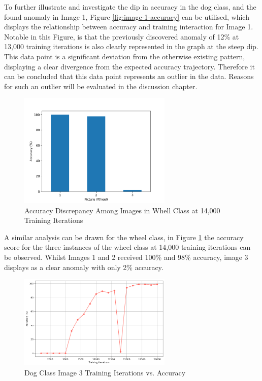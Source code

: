 To further illustrate and investigate the dip in accuracy in the dog class, and the found anomaly in Image 1,  Figure \ref{fig:image-1-accuracy} can be utilised, which displays the relationship between accuracy and training interaction for Image 1. Notable in this Figure, is that the previously discovered anomaly of 12\% at 13,000 training iterations is also clearly represented in the graph at the steep dip. This data point is a significant deviation from the otherwise existing pattern, displaying a clear divergence from the expected accuracy trajectory. Therefore it can be concluded that this data point represents an outlier in the data. Reasons for such an outlier will be evaluated in the discussion chapter.  

\begin{figure}[h!]
   \centering
   \includegraphics[width=0.65\textwidth]{../Data/wheel-outliers.png}
   \caption{Accuracy Discrepancy Among Images in Whell Class at 14,000 Training Iterations}
   \label{fig:13000-wheel}
\end{figure}

A similar analysis can be drawn for the wheel class, in Figure \ref{fig:13000-wheel} the accuracy score for the three instances of the wheel class at 14,000 training iterations can be observed. Whilst Images 1 and 2 received 100\% and 98\% accuracy, image 3 displays as a clear anomaly with only 2\% accuracy. 

\begin{figure}[h!]
   \centering
   \includegraphics[width=0.65\textwidth]{../Data/wheel_image1_accuracy_vs_iteration.png}
   \caption{Dog Class Image 3 Training Iterations vs. Accuracy }
   \label{fig:image-3-accuracy}
\end{figure}


